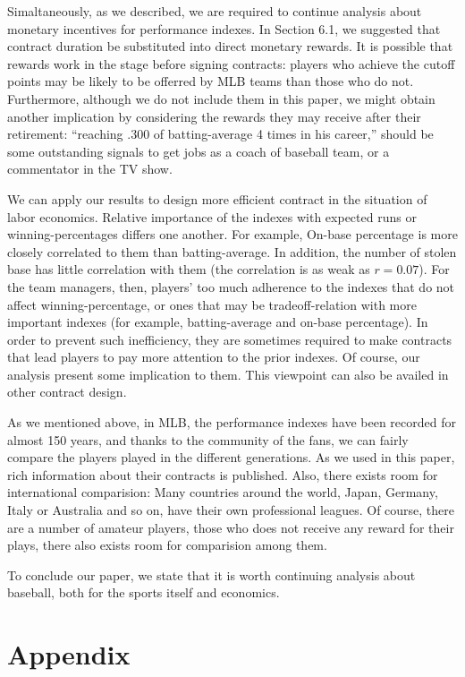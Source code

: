 \documentclass[dvipdfmx, 12pt]{article}
\begin{document}
Simaltaneously, as we described, we are required to continue analysis about monetary incentives for performance indexes. In Section 6.1, we suggested that contract duration be substituted into direct monetary rewards. It is possible that rewards work in the stage before signing contracts: players who achieve the cutoff points may be likely to be offerred by MLB teams than those who do not. Furthermore, although we do not include them in this paper, we might obtain another implication by considering the rewards they may receive after their retirement: ``reaching .300 of batting-average 4 times in his career,'' should be some outstanding signals to get jobs as a coach of baseball team, or a commentator in the TV show.

We can apply our results to design more efficient contract in the situation of labor economics. Relative importance of the indexes with expected runs or winning-percentages differs one another. For example, On-base percentage is more closely correlated to them than batting-average. In addition, the number of stolen base has little correlation with them (the correlation is as weak as $r=0.07$). For the team managers, then, players' too much adherence to the indexes that do not affect winning-percentage, or ones that may be tradeoff-relation with more important indexes (for example, batting-average and on-base percentage). In order to prevent such inefficiency, they are sometimes required to make contracts that lead players to pay more attention to the prior indexes. Of course, our analysis present some implication to them. This viewpoint can also be availed in other contract design.

As we mentioned above, in MLB, the performance indexes have been recorded for almost 150 years, and thanks to the community of the fans, we can fairly compare the players played in the different generations. As we used in this paper, rich information about their contracts is published. Also, there exists room for international comparision: Many countries around the world, Japan, Germany, Italy or Australia and so on, have their own professional leagues. Of course, there are a number of amateur players, those who does not receive any reward for their plays, there also exists room for comparision among them.

To conclude our paper, we state that it is worth continuing analysis about baseball, both for the sports itself and economics.

\section{Appendix}
\end{document}
